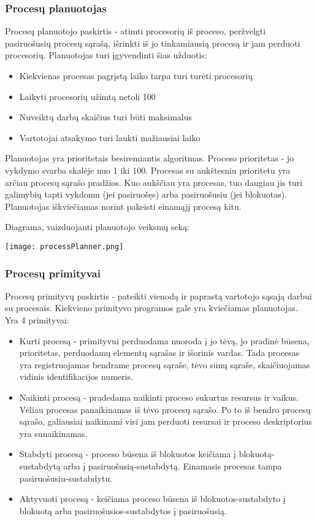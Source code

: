 \subsubsection{Procesų planuotojas}
Procesų planuotojo paskirtis - atimti procesorių iš proceso, peržvelgti pasiruošusių procesų sąrašą, išrinkti iš jo tinkamiausią procesą ir jam perduoti procesorių.
Planuotojas turi įgyvendinti šias užduotis:
	\begin{itemize}
		\item Kiekvienas procesas pagrįstą laiko tarpa turi turėti procesorių
		\item Laikyti procesorių užimtą netoli 100%
		\item Nuveiktų darbų skaičius turi būti maksimalus
		\item Vartotojai atsakymo turi laukti mažiausiai laiko
	\end{itemize}

Planuotojas yra prioritetais besiremiantis algoritmas. Proceso prioritetas - jo vykdymo svarba skalėje nuo 1 iki 100. Procesas su aukštesniu prioritetu yra arčiau procesų sąrašo pradžios.
Kuo aukščiau yra procesas, tuo daugiau jis turi galimybių tapti vykdomu (jei pasiruošęs) arba pasiruošusiu (jei blokuotas). Planuotojas iškviečiamas norint pakeisti einamąjį procesą kitu.

Diagrama, vaizduojanti planuotojo veiksmų seką:

\texttt{[image: processPlanner.png]}

\subsubsection{Procesų primityvai}
Procesų primityvų paskirtis - pateikti vienodą ir paprastą vartotojo sąsają darbui su procesais. Kiekvieno primityvo programos gale yra kviečiamas planuotojas. Yra 4 primityvai:
	\begin{itemize}
		\item Kurti procesą - primityvui perduodama nuoroda į jo tėvą, jo pradinė būsena, prioritetas, perduodamų elementų sąrašas ir išorinis vardas.
			Tada procesas yra registruojamas bendrame procesų sąraše, tėvo sūnų sąraše, skaičiuojamas vidinis identifikacijos numeris.
		\item Naikinti procesą - pradedama naikinti proceso sukurtus resursus ir vaikus. Vėliau procesas panaikinamas iš tėvo procesų sąrašo. Po to iš bendro procesų sąrašo, galiausiai
			naikinami visi jam perduoti resursai ir proceso deskriptorius yra sunaikinamas.
		\item Stabdyti procesą - proceso būsena iš blokuotos keičiama į blokuotą-sustabdytą arba į pasiruošusią-sustabdytą. Einamasis procesas tampa pasiruošusiu-sustabdytu.
		\item Aktyvuoti procesą - keičiama proceso būsena iš blokuotos-sustabdyto į blokuotą arba pasiruošusios-sustabdytos į pasiruošusią.
	\end{itemize}



